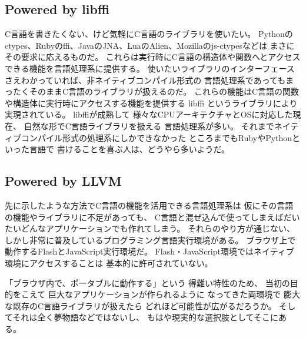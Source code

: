 \subsection{Powered by libffi}
C言語を書きたくない、けど気軽にC言語のライブラリを使いたい。
Pythonのctypes、Rubyのffi、JavaのJNA、LuaのAlien、Mozillaのjs-ctypesなどは
まさにその要求に応えるものだ。
これらは実行時にC言語の構造体や関数へとアクセスできる機能を言語処理系に提供する。
使いたいライブラリのインターフェースさえわかっていれば、非ネイティブコンパイル形式の
言語処理系であってもまったくそのままC言語のライブラリが扱えるのだ。
これらの機能はC言語の関数や構造体に実行時にアクセスする機能を提供する
libffi
というライブラリにより実現されている。
libffiが成熟して
様々なCPUアーキテクチャとOSに対応した現在、
自然な形でC言語ライブラリを扱える
言語処理系が多い。
それまでネイティブコンパイル形式の処理系にしかできなかった
ところまでもRubyやPythonといった言語で
書けることを喜ぶ人は、どうやら多いようだ。

\subsection{Powered by LLVM}
先に示したような方法でC言語の機能を活用できる言語処理系は
仮にその言語の機能やライブラリに不足があっても、
C言語と混ぜ込んで使ってしまえばだいたいどんなアプリケーションでも作れてしまう。
それらのやり方が通じない、しかし非常に普及しているプログラミング言語実行環境がある。
ブラウザ上で動作するFlashとJavaScript実行環境だ。
Flash・JavaScript環境ではネイティブ環境にアクセスすることは
基本的に許可されていない。

「ブラウザ内で、ポータブルに動作する」という
得難い特性のため、
当初の目的をこえて
巨大なアプリケーションが作られるように
なってきた両環境で
膨大な既存のC言語ライブラリが扱えたら
どれほど可能性が広がるだろうか。
そしてそれは全く夢物語などではないし、
もはや現実的な選択肢としてそこにある。


